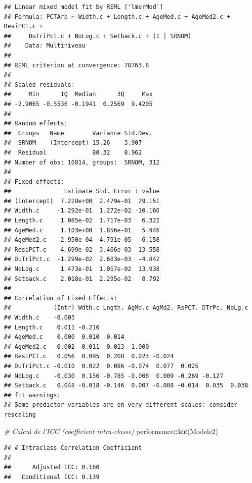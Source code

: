 \documentclass[
  11pt,
  french,
]{book}
\makeatletter
\newenvironment{Shaded}{\begin{snugshade}}{\end{snugshade}}
\newcommand{\CommentTok}[1]{\textcolor[rgb]{0.56,0.35,0.01}{\textit{#1}}}
\newcommand{\KeywordTok}[1]{\textcolor[rgb]{0.13,0.29,0.53}{\textbf{#1}}}
\newcommand{\NormalTok}[1]{#1}
\newcommand{\OperatorTok}[1]{\textcolor[rgb]{0.81,0.36,0.00}{\textbf{#1}}}
\newenvironment{kframe}{%
\medskip{}
\setlength{\fboxsep}{.8em}
 \def\at@end@of@kframe{}%
 \ifinner\ifhmode%
  \def\at@end@of@kframe{\end{minipage}}%
  \begin{minipage}{\columnwidth}%
 \fi\fi%
 \def\FrameCommand##1{\hskip\@totalleftmargin \hskip-\fboxsep
 \colorbox{shadecolor}{##1}\hskip-\fboxsep
     \hskip-\linewidth \hskip-\@totalleftmargin \hskip\columnwidth}%
 \MakeFramed {\advance\hsize-\width
   \@totalleftmargin\z@ \linewidth\hsize
   \@setminipage}}%
 {\par\unskip\endMakeFramed%
 \at@end@of@kframe}
\renewenvironment{Shaded}{\begin{kframe}}{\end{kframe}}
\makeatother
\begin{document}
\begin{verbatim}
## Linear mixed model fit by REML ['lmerMod']
## Formula: PCTArb ~ Width.c + Length.c + AgeMed.c + AgeMed2.c + ResiPCT.c +  
##     DuTriPct.c + NoLog.c + Setback.c + (1 | SRNOM)
##    Data: Multiniveau
## 
## REML criterion at convergence: 78763.8
## 
## Scaled residuals: 
##     Min      1Q  Median      3Q     Max 
## -2.9065 -0.5536 -0.1941  0.2569  9.4205 
## 
## Random effects:
##  Groups   Name        Variance Std.Dev.
##  SRNOM    (Intercept) 15.26    3.907   
##  Residual             80.32    8.962   
## Number of obs: 10814, groups:  SRNOM, 312
## 
## Fixed effects:
##               Estimate Std. Error t value
## (Intercept)  7.228e+00  2.479e-01  29.151
## Width.c     -1.292e-01  1.272e-02 -10.160
## Length.c     1.085e-02  1.717e-03   6.322
## AgeMed.c     1.103e+00  1.856e-01   5.946
## AgeMed2.c   -2.950e-04  4.791e-05  -6.158
## ResiPCT.c    4.699e-02  3.466e-03  13.558
## DuTriPct.c  -1.299e-02  2.683e-03  -4.842
## NoLog.c      1.473e-01  1.057e-02  13.938
## Setback.c    2.018e-01  2.295e-02   8.792
## 
## Correlation of Fixed Effects:
##            (Intr) Wdth.c Lngth. AgMd.c AgMd2. RsPCT. DTrPc. NoLg.c
## Width.c    -0.003                                                 
## Length.c    0.011 -0.216                                          
## AgeMed.c    0.000  0.010 -0.014                                   
## AgeMed2.c   0.002 -0.011  0.013 -1.000                            
## ResiPCT.c   0.056  0.095  0.208  0.023 -0.024                     
## DuTriPct.c -0.010  0.022  0.086 -0.074  0.077  0.025              
## NoLog.c    -0.030  0.156 -0.785 -0.008  0.009 -0.269 -0.127       
## Setback.c   0.048 -0.018 -0.146  0.007 -0.008 -0.014  0.035  0.038
## fit warnings:
## Some predictor variables are on very different scales: consider rescaling
\end{verbatim}

\begin{Shaded}
\begin{Highlighting}[]
\CommentTok{# Calcul de l'ICC (coefficient intra-classe)}
\NormalTok{performance}\OperatorTok{::}\KeywordTok{icc}\NormalTok{(Modele2)}
\end{Highlighting}
\end{Shaded}

\begin{verbatim}
## # Intraclass Correlation Coefficient
## 
##      Adjusted ICC: 0.160
##   Conditional ICC: 0.139
\end{verbatim}
\end{document}
